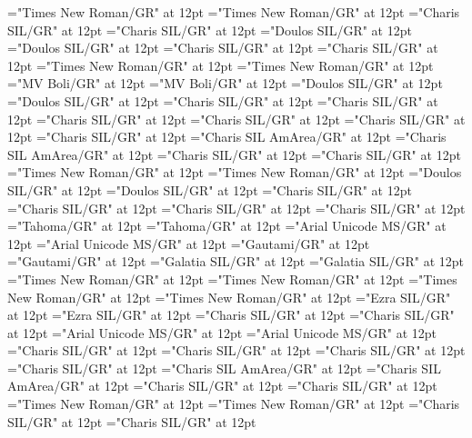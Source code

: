\documentclass[a4paper,twoside]{article}
\begin{document}
\pagestyle{plain}
\sloppy
\setlength{\parfillskip}{0pt plus 1fil}
\font\divarIQ="Times New Roman/GR" at 12pt
\font\spanarIQ="Times New Roman/GR" at 12pt
\font\divbn="Charis SIL/GR" at 12pt
\font\spanbn="Charis SIL/GR" at 12pt
\font\divbzhfonipa="Doulos SIL/GR" at 12pt
\font\spanbzhfonipa="Doulos SIL/GR" at 12pt
\font\divbzh="Charis SIL/GR" at 12pt
\font\spanbzh="Charis SIL/GR" at 12pt
\font\divde="Times New Roman/GR" at 12pt
\font\spande="Times New Roman/GR" at 12pt
\font\divdv="MV Boli/GR" at 12pt
\font\spandv="MV Boli/GR" at 12pt
\font\divenfonipa="Doulos SIL/GR" at 12pt
\font\spanenfonipa="Doulos SIL/GR" at 12pt
\font\divenGB="Charis SIL/GR" at 12pt
\font\spanenGB="Charis SIL/GR" at 12pt
\font\divenPH="Charis SIL/GR" at 12pt
\font\spanenPH="Charis SIL/GR" at 12pt
\font\diven="Charis SIL/GR" at 12pt
\font\spanen="Charis SIL/GR" at 12pt
\font\divesaab="Charis SIL AmArea/GR" at 12pt
\font\spanesaab="Charis SIL AmArea/GR" at 12pt
\font\dives="Charis SIL/GR" at 12pt
\font\spanes="Charis SIL/GR" at 12pt
\font\divfa="Times New Roman/GR" at 12pt
\font\spanfa="Times New Roman/GR" at 12pt
\font\divfrfonipa="Doulos SIL/GR" at 12pt
\font\spanfrfonipa="Doulos SIL/GR" at 12pt
\font\divfrZxxxxaudio="Charis SIL/GR" at 12pt
\font\spanfrZxxxxaudio="Charis SIL/GR" at 12pt
\font\divfr="Charis SIL/GR" at 12pt
\font\spanfr="Charis SIL/GR" at 12pt
\font\divggofonipaxemic="Tahoma/GR" at 12pt
\font\spanggofonipaxemic="Tahoma/GR" at 12pt
\font\divggoINxaheri="Arial Unicode MS/GR" at 12pt
\font\spanggoINxaheri="Arial Unicode MS/GR" at 12pt
\font\divggoTeluIN="Gautami/GR" at 12pt
\font\spanggoTeluIN="Gautami/GR" at 12pt
\font\divgrc="Galatia SIL/GR" at 12pt
\font\spangrc="Galatia SIL/GR" at 12pt
\font\divhagLatnGHfonipaxemic="Times New Roman/GR" at 12pt
\font\spanhagLatnGHfonipaxemic="Times New Roman/GR" at 12pt
\font\divhag="Times New Roman/GR" at 12pt
\font\spanhag="Times New Roman/GR" at 12pt
\font\divhbo="Ezra SIL/GR" at 12pt
\font\spanhbo="Ezra SIL/GR" at 12pt
\font\divhe="Charis SIL/GR" at 12pt
\font\spanhe="Charis SIL/GR" at 12pt
\font\divhi="Arial Unicode MS/GR" at 12pt
\font\spanhi="Arial Unicode MS/GR" at 12pt
\font\divhu="Charis SIL/GR" at 12pt
\font\spanhu="Charis SIL/GR" at 12pt
\font\divibafonipa="Charis SIL/GR" at 12pt
\font\spanibafonipa="Charis SIL/GR" at 12pt
\font\diviba="Charis SIL AmArea/GR" at 12pt
\font\spaniba="Charis SIL AmArea/GR" at 12pt
\font\dividZxxxxaudio="Charis SIL/GR" at 12pt
\font\spanidZxxxxaudio="Charis SIL/GR" at 12pt
\font\divid="Times New Roman/GR" at 12pt
\font\spanid="Times New Roman/GR" at 12pt
\font\diviixpin="Charis SIL/GR" at 12pt
\font\spaniixpin="Charis SIL/GR" at 12pt
\end{document}
